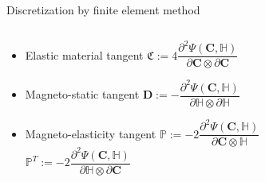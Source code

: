 \documentclass{beamer}
\begin{document}
\begin{frame}{Discretization by finite element method}
\begin{itemize}
{\begin{columns}
\begin{column}{0.39\textwidth}
\begin{itemize}
\item Elastic material tangent $\mathfrak{C} := 4\dfrac{\partial^2 \Psi (\mathbf{C}, \mathbb{H})}{\partial \mathbf{C} \otimes \partial \mathbf{C}}$
\item Magneto-static tangent $\mathbf{D} := -\dfrac{\partial^2 \Psi (\mathbf{C}, \mathbb{H})}{\partial \mathbb{H} \otimes \partial \mathbb{H}}$
\item Magneto-elasticity tangent $\mathbb{P} := -2 \dfrac{\partial^2 \Psi (\mathbf{C}, \mathbb{H})}{\partial \mathbf{C} \otimes \mathbb{H}}$ \\
$\mathbb{P}^T := -2 \dfrac{\partial^2 \Psi (\mathbf{C}, \mathbb{H})}{\partial \mathbb{H} \otimes \partial \mathbf{C}}$
\end{itemize}
\end{column}
\end{columns}
}%
\end{itemize}
\end{frame}
\end{document}
